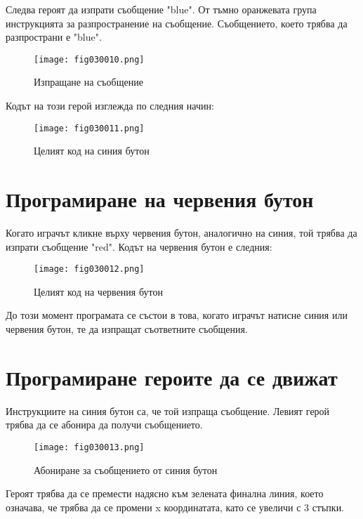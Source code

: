 Следва героят да изпрати съобщение "blue". От тъмно оранжевата група инструкцията за разпространение на съобщение. Съобщението, което трябва да разпространи е "blue".

\begin{figure}[H]
  \centering
  \texttt{[image: fig030010.png]}
  \caption{Изпращане на съобщение}
\label{fig030010}
\end{figure}

Кодът на този герой изглежда по следния начин:

\begin{figure}[H]
  \centering
  \texttt{[image: fig030011.png]}
  \caption{Целият код на синия бутон}
\label{fig030011}
\end{figure}

\section{Програмиране на червения бутон}
Когато играчът кликне върху червения бутон, аналогично на синия, той трябва да изпрати съобщение "red". Кодът на червения бутон е следния:

\begin{figure}[H]
  \centering
  \texttt{[image: fig030012.png]}
  \caption{Целият код на червения бутон}
\label{fig030012}
\end{figure}

До този момент програмата се състои в това, когато играчът натисне синия или червения бутон, те да изпращат съответните съобщения.

\section{Програмиране героите да се движат}
Инструкциите на синия бутон са, че той изпраща съобщение. Левият герой трябва да се абонира да получи съобщението.

\begin{figure}[H]
  \centering
  \texttt{[image: fig030013.png]}
  \caption{Абониране за съобщението от синия бутон}
\label{fig030013}
\end{figure}

Героят трябва да се премести надясно към зелената финална линия, което означава, че трябва да се промени x координатата, като се увеличи с 3 стъпки.

